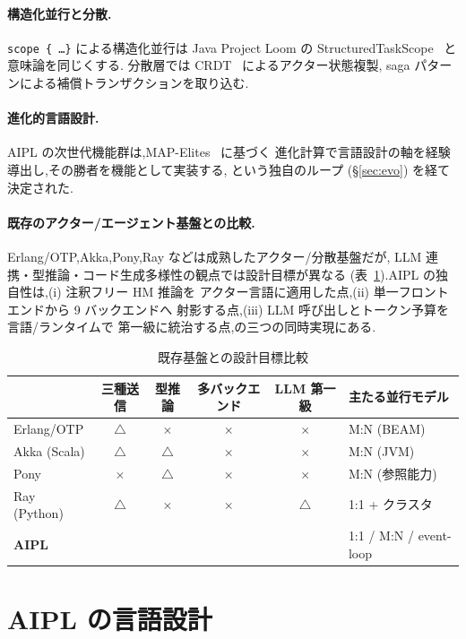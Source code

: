 \documentclass[11pt,a4paper]{article}
\newcommand{\Yes}{\textcolor{green!50!black}{\textbf{\checkmark}}}
\newcommand{\No}{\textcolor{red!70!black}{$\times$}}
\newcommand{\Part}{\textcolor{orange!80!black}{$\triangle$}}
\newcommand{\code}[1]{\texttt{\small #1}}
\begin{document}
\paragraph{構造化並行と分散.}
\code{scope \{ \dots \}} による構造化並行は Java Project Loom の
\textsf{StructuredTaskScope}~\cite{loom} と意味論を同じくする.
分散層では CRDT~\cite{crdt} によるアクター状態複製,
saga パターンによる補償トランザクションを取り込む.

\paragraph{進化的言語設計.}
AIPL の次世代機能群は,MAP-Elites~\cite{mapelites} に基づく
進化計算で言語設計の軸を経験導出し,その勝者を機能として実装する,
という独自のループ (\S\ref{sec:evo}) を経て決定された.

\paragraph{既存のアクター/エージェント基盤との比較.}
Erlang/OTP,Akka,Pony,Ray などは成熟したアクター/分散基盤だが,
LLM 連携・型推論・コード生成多様性の観点では設計目標が異なる
(表~\ref{tab:compare}).AIPL の独自性は,(i) 注釈フリー HM 推論を
アクター言語に適用した点,(ii) 単一フロントエンドから 9 バックエンドへ
射影する点,(iii) LLM 呼び出しとトークン予算を言語/ランタイムで
第一級に統治する点,の三つの同時実現にある.

\begin{table}[h]
\centering\small
\caption{既存基盤との設計目標比較}\label{tab:compare}
\begin{tabularx}{\linewidth}{@{}l c c c c X@{}}
\toprule
 & 三種送信 & 型推論 & 多バックエンド & LLM 第一級 & 主たる並行モデル \\
\midrule
Erlang/OTP & \Part & \No & \No & \No & M:N (BEAM) \\
Akka (Scala) & \Part & \Part & \No & \No & M:N (JVM) \\
Pony & \No & \Part & \No & \No & M:N (参照能力) \\
Ray (Python) & \Part & \No & \No & \Part & 1:1 + クラスタ \\
\textbf{AIPL} & \Yes & \Yes & \Yes & \Yes & 1:1 / M:N / event-loop \\
\bottomrule
\end{tabularx}
\end{table}

\section{AIPL の言語設計}\label{sec:design}
\end{document}
